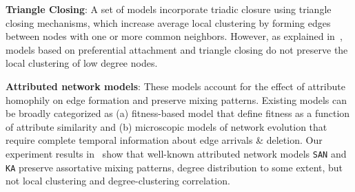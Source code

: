 
\textbf{Triangle Closing}:
A set of models
\cite{holme2002growing,klemm2002highly,leskovec2008microscopic}
incorporate triadic closure using triangle closing mechanisms,
which increase {average} local clustering by forming edges between nodes
with one or more common neighbors. However, as explained in~, models
based on preferential attachment and triangle closing do not preserve the local
clustering of low degree nodes.

\textbf{Attributed network models}:
These models \cite{de2013scale,karimi2017visibility,gong2012evolution,zheleva2009co}
account for the effect of attribute homophily on edge formation and preserve mixing patterns.
Existing models can be broadly categorized as (a) fitness-based model that define fitness as a function of
attribute similarity and (b) microscopic models of network evolution that require
complete temporal information about edge arrivals \& deletion. Our experiment
results in~ show that well-known attributed network models
\texttt{SAN} and \texttt{KA} preserve assortative
mixing patterns, degree distribution to some extent, but not local clustering
and degree-clustering correlation.

